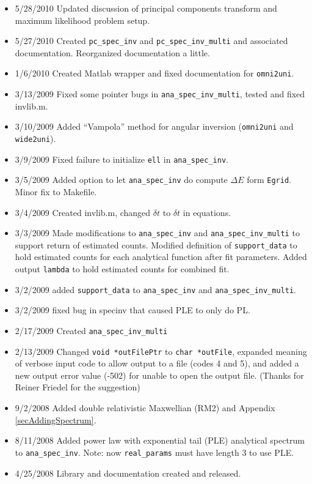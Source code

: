 \documentclass{article}    %
\begin{document}
\begin{itemize}
\item{5/28/2010} Updated discussion of principal components transform and maximum likelihood problem setup.
\item{5/27/2010} Created \verb|pc_spec_inv| and \verb|pc_spec_inv_multi| and associated documentation. Reorganized documentation a little.
\item{1/6/2010} Created Matlab wrapper and fixed documentation for \verb|omni2uni|.
\item{3/13/2009} Fixed some pointer bugs in \verb|ana_spec_inv_multi|, tested and fixed invlib.m.
\item{3/10/2009} Added ``Vampola'' method for angular inversion (\verb|omni2uni| and \verb|wide2uni|).
\item{3/9/2009} Fixed failure to initialize \verb|ell| in \verb|ana_spec_inv|.
\item{3/5/2009} Added option to let \verb|ana_spec_inv| do compute $\Delta E$ form \verb|Egrid|. Minor fix to Makefile.
\item{3/4/2009} Created invlib.m, changed $\delta t$ to $\delta t$ in equations.
\item{3/3/2009} Made modifications to \verb|ana_spec_inv| and \verb|ana_spec_inv_multi| to support return of estimated counts.
\subitem Modified definition of \verb|support_data| to hold estimated counts for each analytical function after fit parameters.
\subitem Added output \verb|lambda| to hold estimated counts for combined fit.
\item{3/2/2009} added \verb|support_data| to \verb|ana_spec_inv| and \verb|ana_spec_inv_multi|.
\item{3/2/2009} fixed bug in specinv that caused PLE to only do PL.
\item{2/17/2009} Created \verb|ana_spec_inv_multi|
\item{2/13/2009} Changed \verb|void *outFilePtr| to \verb|char *outFile|, 
  expanded meaning of verbose input code to allow output to a file (codes 4 and 5), 
  and added a new output error value (-502) for unable to open the output file. 
  (Thanks for Reiner Friedel for the suggestion)
\item{9/2/2008} Added double relativistic Maxwellian (RM2) and Appendix \ref{secAddingSpectrum}.
\item{8/11/2008} Added power law with exponential tail (PLE)
  analytical spectrum to \verb|ana_spec_inv|. Note: now
  \verb|real_params| must have length 3 to use PLE.
\item{4/25/2008} Library and documentation created and released.
\end{itemize}
\end{document}
